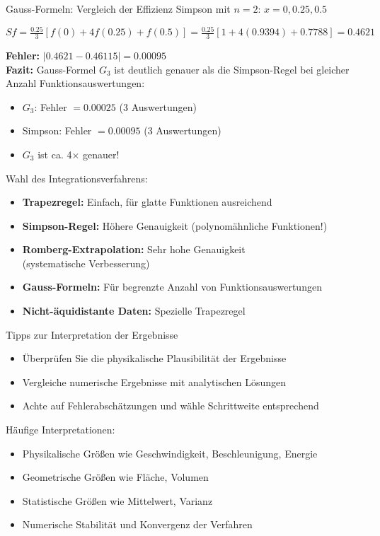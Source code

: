 \begin{example2}{Gauss-Formeln: Vergleich der Effizienz}
Simpson mit $n=2$: $x = 0, 0.25, 0.5$

$Sf = \frac{0.25}{3}[f(0) + 4f(0.25) + f(0.5)] = \frac{0.25}{3}[1 + 4(0.9394) + 0.7788] = 0.4621$

\textbf{Fehler:} $|0.4621 - 0.46115| = 0.00095$
\vspace{1mm}\\
\textbf{Fazit:} Gauss-Formel $G_3$ ist deutlich genauer als die Simpson-Regel bei gleicher Anzahl Funktionsauswertungen:
\begin{itemize}
    \item $G_3$: Fehler $= 0.00025$ (3 Auswertungen)
    \item Simpson: Fehler $= 0.00095$ (3 Auswertungen)
    \item $G_3$ ist ca. 4× genauer!
\end{itemize}
\end{example2}

\begin{KR}{Wahl des Integrationsverfahrens:}
\begin{itemize}
    \item \textbf{Trapezregel:} Einfach, für glatte Funktionen ausreichend
    \item \textbf{Simpson-Regel:} Höhere Genauigkeit (polynomähnliche Funktionen!)
    \item \textbf{Romberg-Extrapolation:} Sehr hohe Genauigkeit\\ (systematische Verbesserung)
    \item \textbf{Gauss-Formeln:} Für begrenzte Anzahl von Funktionsauswertungen
    \item \textbf{Nicht-äquidistante Daten:} Spezielle Trapezregel
\end{itemize}
\end{KR}

\begin{concept}{Tipps zur Interpretation der Ergebnisse}
\begin{itemize}
    \item Überprüfen Sie die physikalische Plausibilität der Ergebnisse
    \item Vergleiche numerische Ergebnisse mit analytischen Lösungen
    \item Achte auf Fehlerabschätzungen und wähle Schrittweite entsprechend
\end{itemize}
Häufige Interpretationen:
\begin{itemize}
    \item Physikalische Größen wie Geschwindigkeit, Beschleunigung, Energie
    \item Geometrische Größen wie Fläche, Volumen
    \item Statistische Größen wie Mittelwert, Varianz
    \item Numerische Stabilität und Konvergenz der Verfahren
\end{itemize}    
\end{concept}


